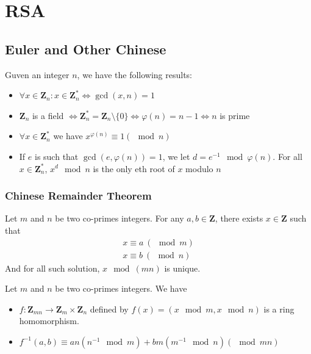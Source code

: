 \documentclass[11pt,a4paper]{article}
\newcommand{\bz}{\ensuremath{\mathbf{Z}}}
\begin{document}

\section{RSA}
\subsection{Euler and Other Chinese} %
\label{sub:Euler and Other Chinese}
\begin{theorem}
    Guven an integer $n$, we have the following results:
    \begin{itemize}
        \item $\forall x \in \bz_n: x \in \bz_n^* \iff \gcd(x,n) = 1$
        \item $\bz_n$ is a field $\iff \bz_n^* = \bz_n\setminus\{0\} \iff \varphi(n) = n-1 \iff n$ is prime
        \item $\forall x \in \bz_n^*$ we have $x^{\varphi(n)} \equiv 1 (\mod n)$
        \item If $e$ is such that $\gcd(e,\varphi(n)) = 1$, we let $d = e^{-1} \mod \varphi(n)$. For all $x \in \bz_n^*$, $x^d \mod n$ is the only eth root of $x$ modulo $n$
    \end{itemize}
\end{theorem}

\subsubsection{Chinese Remainder Theorem} %
\label{ssub:Chinese Remainder Theorem}
\begin{theorem}
    Let $m$ and $n$ be two co-primes integers. For any $a,b \in \bz$, there exists $x\in\bz$ such that
    \begin{align*}
        x \equiv a\ (\mod m)\\
        x \equiv b\ (\mod n)
    \end{align*}
    And for all such solution, $x \mod (mn)$ is unique.
\end{theorem}

\begin{theorem}
    Let $m$ and $n$ be two co-primes integers. We have
    \begin{itemize}
        \item $f: \bz_{mn} \to \bz_m \times \bz_n$ defined by $f(x) = (x \mod m, x \mod n)$ is a ring homomorphism.
        \item $f^{-1}(a,b) \equiv an(n^{-1} \mod m) + bm(m^{-1} \mod n) (\mod mn)$
    \end{itemize}
\end{theorem}
\end{document}

